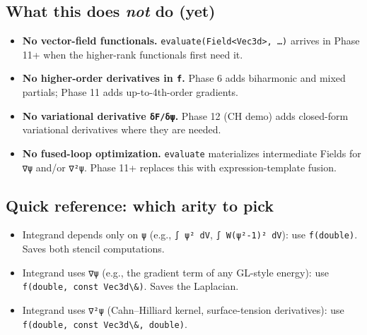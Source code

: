 \subsection{\texorpdfstring{What this does \emph{not} do
(yet)}{What this does not do (yet)}}\label{what-this-does-not-do-yet}

\begin{itemize}
\tightlist
\item
  \textbf{No vector-field functionals.}
  \passthrough{\lstinline!evaluate(Field<Vec3d>, …)!} arrives in Phase
  11+ when the higher-rank functionals first need it.
\item
  \textbf{No higher-order derivatives in \passthrough{\lstinline!f!}.}
  Phase 6 adds biharmonic and mixed partials; Phase 11 adds
  up-to-4th-order gradients.
\item
  \textbf{No variational derivative \passthrough{\lstinline!δF/δψ!}.}
  Phase 12 (CH demo) adds closed-form variational derivatives where they
  are needed.
\item
  \textbf{No fused-loop optimization.}
  \passthrough{\lstinline!evaluate!} materializes intermediate Fields
  for \passthrough{\lstinline!∇ψ!} and/or \passthrough{\lstinline!∇²ψ!}.
  Phase 11+ replaces this with expression-template fusion.
\end{itemize}

\subsection{Quick reference: which arity to
pick}\label{quick-reference-which-arity-to-pick}

\begin{itemize}
\tightlist
\item
  Integrand depends only on \passthrough{\lstinline!ψ!} (e.g.,
  \passthrough{\lstinline!∫ ψ² dV!},
  \passthrough{\lstinline!∫ W(ψ²-1)² dV!}): use
  \passthrough{\lstinline!f(double)!}. Saves both stencil computations.
\item
  Integrand uses \passthrough{\lstinline!∇ψ!} (e.g., the gradient term
  of any GL-style energy): use
  \passthrough{\lstinline!f(double, const Vec3d\&)!}. Saves the
  Laplacian.
\item
  Integrand uses \passthrough{\lstinline!∇²ψ!} (Cahn--Hilliard kernel,
  surface-tension derivatives): use
  \passthrough{\lstinline!f(double, const Vec3d\&, double)!}.
\end{itemize}
